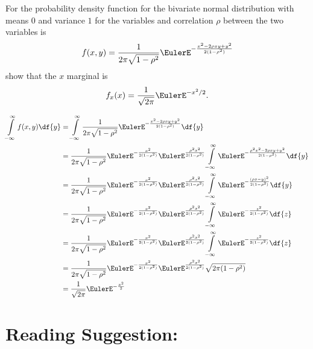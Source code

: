 \documentclass[12pt]{article}
\begin{document}
\begin{exercise}
    For the probability density function for the bivariate normal
    distribution with means \( 0 \) and variance \( 1 \) for the
    variables and correlation \( \rho \) between the two variables is
    \[
        f(x, y) = \frac{1}{2\pi \sqrt{1 - \rho^2}} \EulerE^{- \frac{x^2
        - 2 \rho x y + y^2}{2(1-\rho^2)}}
    \] show that the \( x \) marginal is
    \[
        f_{x}(x) = \frac{1}{\sqrt{2\pi}} \EulerE^{-x^2/2}.
    \]
\end{exercise}
\begin{solution}
    \begin{align*}
        \int\limits_{-\infty}^{\infty}f(x, y) \df{y} &= \int\limits_{-\infty}^
        {\infty}\frac{1}{2\pi \sqrt{1 - \rho^2}} \EulerE^{- \frac{x^2 -
        2 \rho x y + y^2}{2(1-\rho^2)}} \df{y} \\
        &= \frac{1}{2\pi \sqrt{1 - \rho^2}} \EulerE^{- \frac{x^2}{2(1-\rho^2)}}
        \EulerE^{\frac{\rho^2 x^2}{2(1-\rho^2)}} \int\limits_{-\infty}^{\infty}
        \EulerE^{- \frac{\rho^2 x^2- 2 \rho x y + y^2}{2(1-\rho^2)}} \df
        {y} \\
        &= \frac{1}{2\pi \sqrt{1 - \rho^2}} \EulerE^{- \frac{x^2}{2(1-\rho^2)}}
        \EulerE^{\frac{\rho^2 x^2}{2(1-\rho^2)}} \int\limits_{-\infty}^{\infty}
        \EulerE^{- \frac{(\rho x - y)^2}{2(1-\rho^2)}} \df{y} \\
        &= \frac{1}{2\pi \sqrt{1 - \rho^2}} \EulerE^{- \frac{x^2}{2(1-\rho^2)}}
        \EulerE^{\frac{\rho^2 x^2}{2(1-\rho^2)}} \int\limits_{-\infty}^{\infty}
        \EulerE^{- \frac{z^2}{2(1-\rho^2)}} \df{z} \\
        &= \frac{1}{2\pi \sqrt{1 - \rho^2}} \EulerE^{- \frac{x^2}{2(1-\rho^2)}}
        \EulerE^{\frac{\rho^2 x^2}{2(1-\rho^2)}} \int\limits_{-\infty}^{\infty}
        \EulerE^{- \frac{z^2}{2(1-\rho^2)}} \df{z} \\
        &= \frac{1}{2\pi \sqrt{1 - \rho^2}} \EulerE^{- \frac{x^2}{2(1-\rho^2)}}
        \EulerE^{\frac{\rho^2 x^2}{2(1-\rho^2)}} \sqrt{2\pi(1 - \rho^2)}
        \\
        &= \frac{1}{\sqrt{2\pi}} \EulerE^{- \frac{x^2}{2}}
    \end{align*}
\end{solution}

\hr

\section*{Reading Suggestion:}
\end{document}
